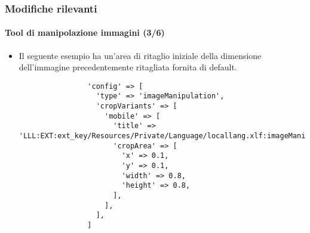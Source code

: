 
\begin{frame}[fragile]
	\frametitle{Modifiche rilevanti}
	\framesubtitle{Tool di manipolazione immagini (3/6)}

	\lstset{basicstyle=\tiny\ttfamily}

	\begin{itemize}

		\item Il seguente esempio ha un'area di ritaglio iniziale della dimensione dell'immagine precedentemente
				ritagliata fornita di default.

			\begin{lstlisting}
				'config' => [
				  'type' => 'imageManipulation',
				  'cropVariants' => [
				    'mobile' => [
				      'title' => 'LLL:EXT:ext_key/Resources/Private/Language/locallang.xlf:imageManipulation.mobile',
				      'cropArea' => [
				        'x' => 0.1,
				        'y' => 0.1,
				        'width' => 0.8,
				        'height' => 0.8,
				      ],
				    ],
				  ],
				]
			\end{lstlisting}

	\end{itemize}

\end{frame}


